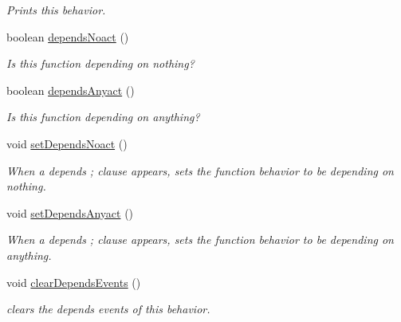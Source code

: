 \begin{DoxyCompactItemize}
\begin{DoxyCompactList}\small\item\em Prints this behavior. \end{DoxyCompactList}\item 
boolean \hyperlink{classedu_1_1udel_1_1cis_1_1vsl_1_1civl_1_1model_1_1common_1_1contract_1_1CommonFunctionBehavior_a024acdc5f10c50e7049b40054a5f7388}{depends\+Noact} ()
\begin{DoxyCompactList}\small\item\em Is this function depending on nothing? \end{DoxyCompactList}\item 
boolean \hyperlink{classedu_1_1udel_1_1cis_1_1vsl_1_1civl_1_1model_1_1common_1_1contract_1_1CommonFunctionBehavior_a1fda256a7065a3968baee25c772e6dec}{depends\+Anyact} ()
\begin{DoxyCompactList}\small\item\em Is this function depending on anything? \end{DoxyCompactList}\item 
void \hyperlink{classedu_1_1udel_1_1cis_1_1vsl_1_1civl_1_1model_1_1common_1_1contract_1_1CommonFunctionBehavior_a6ceed9313d18c1ce441e8ab04775021d}{set\+Depends\+Noact} ()
\begin{DoxyCompactList}\small\item\em When a {\ttfamily depends ;} clause appears, sets the function behavior to be depending on nothing. \end{DoxyCompactList}\item 
void \hyperlink{classedu_1_1udel_1_1cis_1_1vsl_1_1civl_1_1model_1_1common_1_1contract_1_1CommonFunctionBehavior_a5242fa038f0bbef971ecaca6f107d3db}{set\+Depends\+Anyact} ()
\begin{DoxyCompactList}\small\item\em When a {\ttfamily depends ;} clause appears, sets the function behavior to be depending on anything. \end{DoxyCompactList}\item 
\hypertarget{classedu_1_1udel_1_1cis_1_1vsl_1_1civl_1_1model_1_1common_1_1contract_1_1CommonFunctionBehavior_acbcec281146885d722799e11e2abe919}{}void \hyperlink{classedu_1_1udel_1_1cis_1_1vsl_1_1civl_1_1model_1_1common_1_1contract_1_1CommonFunctionBehavior_acbcec281146885d722799e11e2abe919}{clear\+Depends\+Events} ()\label{classedu_1_1udel_1_1cis_1_1vsl_1_1civl_1_1model_1_1common_1_1contract_1_1CommonFunctionBehavior_acbcec281146885d722799e11e2abe919}

\begin{DoxyCompactList}\small\item\em clears the depends events of this behavior. \end{DoxyCompactList}\end{DoxyCompactItemize}



